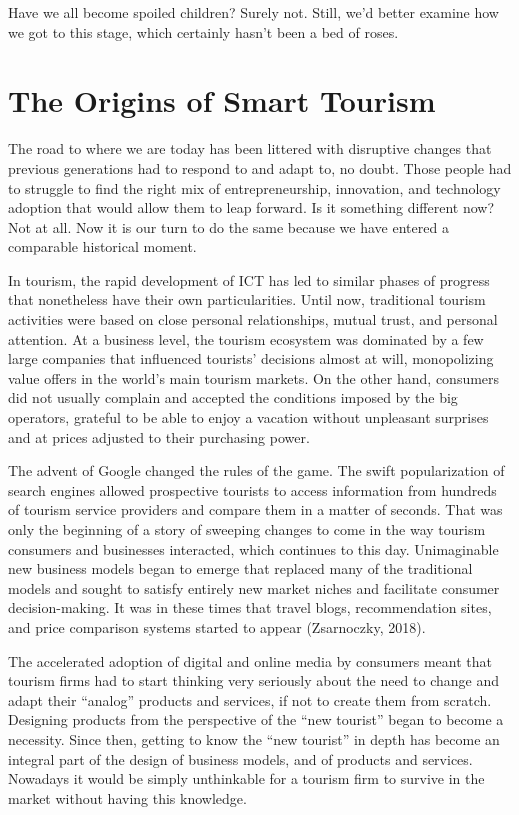 \documentclass[
  letterpaper,
  DIV=11,
  numbers=noendperiod]{scrreprt}
\begin{document}
Have we all become spoiled children? Surely not. Still, we'd better
examine how we got to this stage, which certainly hasn't been a bed of
roses.

\hypertarget{the-origins-of-smart-tourism}{%
\section{The Origins of Smart
Tourism}\label{the-origins-of-smart-tourism}}

The road to where we are today has been littered with disruptive changes
that previous generations had to respond to and adapt to, no doubt.
Those people had to struggle to find the right mix of entrepreneurship,
innovation, and technology adoption that would allow them to leap
forward. Is it something different now? Not at all. Now it is our turn
to do the same because we have entered a comparable historical moment.

In tourism, the rapid development of ICT has led to similar phases of
progress that nonetheless have their own particularities. Until now,
traditional tourism activities were based on close personal
relationships, mutual trust, and personal attention. At a business
level, the tourism ecosystem was dominated by a few large companies that
influenced tourists' decisions almost at will, monopolizing value offers
in the world's main tourism markets. On the other hand, consumers did
not usually complain and accepted the conditions imposed by the big
operators, grateful to be able to enjoy a vacation without unpleasant
surprises and at prices adjusted to their purchasing power.

The advent of Google changed the rules of the game. The swift
popularization of search engines allowed prospective tourists to access
information from hundreds of tourism service providers and compare them
in a matter of seconds. That was only the beginning of a story of
sweeping changes to come in the way tourism consumers and businesses
interacted, which continues to this day. Unimaginable new business
models began to emerge that replaced many of the traditional models and
sought to satisfy entirely new market niches and facilitate consumer
decision-making. It was in these times that travel blogs, recommendation
sites, and price comparison systems started to appear (Zsarnoczky,
2018).

The accelerated adoption of digital and online media by consumers meant
that tourism firms had to start thinking very seriously about the need
to change and adapt their ``analog'' products and services, if not to
create them from scratch. Designing products from the perspective of the
``new tourist'' began to become a necessity. Since then, getting to know
the ``new tourist'' in depth has become an integral part of the design
of business models, and of products and services. Nowadays it would be
simply unthinkable for a tourism firm to survive in the market without
having this knowledge.
\end{document}
